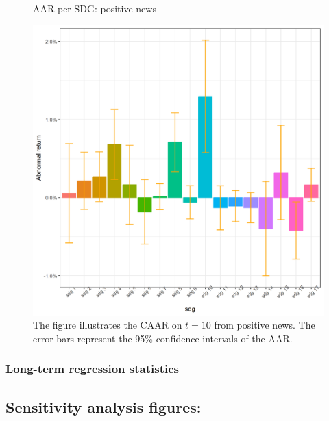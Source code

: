 \begin{figure} [H]
    \centering
    \caption{AAR per SDG: positive news}
    \includegraphics[scale=0.5]{Projekt/1.Figures analysis/ST_positive_sdg_bar.png}
    \caption*{\footnotesize The figure illustrates the CAAR on $t = 10$ from positive news. The error bars represent the 95\% confidence intervals of the AAR.}
    \label{fig:ST_pos_bar_all}
\end{figure}

\subsubsection{Long-term regression statistics}











\subsection{Sensitivity analysis figures:} \label{app: sensitivity}


